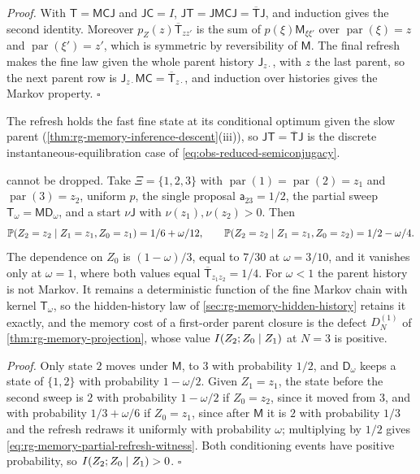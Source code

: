\noindent\emph{Proof.}
With $\mathsf T=\mathsf M\mathsf C\mathsf J$ and $\mathsf J\mathsf C=I$,
$\mathsf J\mathsf T=\mathsf J\mathsf M\mathsf C\mathsf J=\overline{\mathsf T}\mathsf J$,
and induction gives the second identity. Moreover $p_Z(z)\overline{\mathsf T}_{zz'}$
is the sum of $p(\xi)\mathsf M_{\xi\xi'}$ over $\operatorname{par}(\xi)=z$ and
$\operatorname{par}(\xi')=z'$, which is symmetric by reversibility of $\mathsf M$. The
final refresh makes the fine law given the whole parent history $\mathsf J_{z\cdot}$,
with $z$ the last parent, so the next parent row is
$\mathsf J_{z\cdot}\mathsf M\mathsf C=\overline{\mathsf T}_{z\cdot}$, and induction over
histories gives the Markov property. $\square$

The refresh holds the fast fine state at its conditional optimum given the slow parent
(\cref{thm:rg-memory-inference-descent}(iii)), so $\mathsf J\mathsf T=\overline{\mathsf T}\mathsf J$
is the discrete instantaneous-equilibration case of \eqref{eq:obs-reduced-semiconjugacy}.

 cannot be dropped. Take
$\Xi=\{1,2,3\}$ with $\operatorname{par}(1)=\operatorname{par}(2)=z_1$ and
$\operatorname{par}(3)=z_2$, uniform $p$, the single proposal
$\mathsf a_{23}=1/2$, the partial sweep
$\mathsf T_\omega=\mathsf M\mathsf D_\omega$, and a start $\nu\mathsf J$ with
$\nu(z_1),\nu(z_2)>0$. Then
\begin{equation}
\mathbb P(Z_2=z_2\mid Z_1=z_1,Z_0=z_1)=1/6+\omega/12,
\qquad
\mathbb P(Z_2=z_2\mid Z_1=z_1,Z_0=z_2)=1/2-\omega/4.
\label{eq:rg-memory-partial-refresh-witness}
\end{equation}
The dependence on $Z_0$ is $(1-\omega)/3$, equal to $7/30$ at $\omega=3/10$, and it
vanishes only at $\omega=1$, where both values equal
$\overline{\mathsf T}_{z_1z_2}=1/4$. For $\omega<1$ the parent history is not
Markov. It remains a deterministic function of the fine Markov chain with kernel
$\mathsf T_\omega$, so the hidden-history law of \cref{sec:rg-memory-hidden-history}
retains it exactly, and the memory cost of a first-order parent closure is the
defect $D_N^{(1)}$ of \cref{thm:rg-memory-projection}, whose value
$I(Z_2;Z_0\mid Z_1)$ at $N=3$ is positive. 

\noindent\emph{Proof.}
Only state $2$ moves under $\mathsf M$, to $3$ with probability $1/2$, and
$\mathsf D_\omega$ keeps a state of $\{1,2\}$ with probability $1-\omega/2$. Given
$Z_1=z_1$, the state before the second sweep is $2$ with probability
$1-\omega/2$ if $Z_0=z_2$, since it moved from $3$, and with probability
$1/3+\omega/6$ if $Z_0=z_1$, since after $\mathsf M$ it is $2$ with probability
$1/3$ and the refresh redraws it uniformly with probability $\omega$; multiplying
by $1/2$ gives
\eqref{eq:rg-memory-partial-refresh-witness}. Both conditioning events have positive
probability, so $I(Z_2;Z_0\mid Z_1)>0$. $\square$

